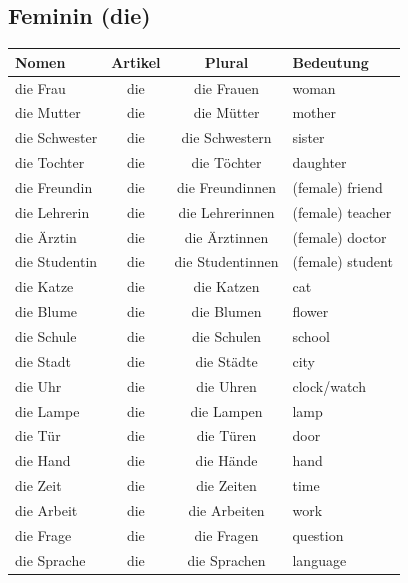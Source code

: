 \subsection{Feminin (die)}
\begin{center}
\begin{tabular}{|l|c|c|l|}
\hline
\textbf{Nomen} & \textbf{Artikel} & \textbf{Plural} & \textbf{Bedeutung} \\ \hline
die Frau & die & die Frauen & woman \\ \hline
die Mutter & die & die Mütter & mother \\ \hline
die Schwester & die & die Schwestern & sister \\ \hline
die Tochter & die & die Töchter & daughter \\ \hline
die Freundin & die & die Freundinnen & (female) friend \\ \hline
die Lehrerin & die & die Lehrerinnen & (female) teacher \\ \hline
die Ärztin & die & die Ärztinnen & (female) doctor \\ \hline
die Studentin & die & die Studentinnen & (female) student \\ \hline
die Katze & die & die Katzen & cat \\ \hline
die Blume & die & die Blumen & flower \\ \hline
die Schule & die & die Schulen & school \\ \hline
die Stadt & die & die Städte & city \\ \hline
die Uhr & die & die Uhren & clock/watch \\ \hline
die Lampe & die & die Lampen & lamp \\ \hline
die Tür & die & die Türen & door \\ \hline
die Hand & die & die Hände & hand \\ \hline
die Zeit & die & die Zeiten & time \\ \hline
die Arbeit & die & die Arbeiten & work \\ \hline
die Frage & die & die Fragen & question \\ \hline
die Sprache & die & die Sprachen & language \\ \hline
\end{tabular}
\end{center}


